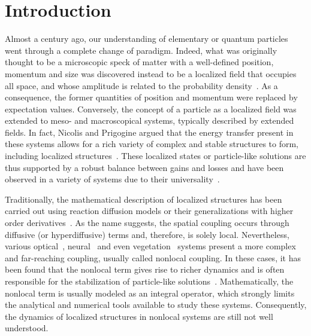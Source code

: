 \chapter{Introduction}

\label{ch:intro}

Almost a century ago, our understanding of elementary or quantum particles went
through a complete change of paradigm. Indeed, what was originally thought
to be a microscopic speck of matter with a well-defined position, momentum and size
was discovered instead to be a localized field that occupies all space, 
and whose amplitude is related to the probability 
density~\cite{merzbacher1998quantum,messiah2014quantum,gross1962particle}.
As a consequence,
the former quantities of position and momentum were replaced by expectation values.
Conversely, the concept of a particle as a localized field was extended to 
meso- and macroscopical systems, typically described by extended fields.
In fact, Nicolis and Prigogine argued that the energy transfer present in these systems
allows for a rich variety of complex and stable structures to form, including localized 
structures~\cite{prigogine1977self, pismen2006patterns}.
These localized states or particle-like solutions are thus supported by a robust balance between 
gains and losses and have been observed in a variety of systems due to their 
universality~\cite{umbanhowar1996localized,aranson2006patterns,minardi2010three,verschueren2013spatiotemporal,yi2018imaging}. 

Traditionally, the mathematical description of localized structures has been carried out using
reaction diffusion models or their generalizations with higher order 
derivatives~\cite{tlidi1994localized,coullet2000stable,knobloch2015spatial}.
As the name suggests, the spatial coupling occurs through diffusive (or hyperdiffusive) terms and, 
therefore, is solely local. Nevertheless, various optical~\cite{gelens2007impact}, 
neural~\cite{coombes2005waves} and even vegetation~\cite{lefever1997origin} systems present a more 
complex and far-reaching coupling, usually called nonlocal coupling. In these cases,
it has been found that the nonlocal term gives rise to richer dynamics and is often responsible for the
stabilization of particle-like solutions~\cite{fernandez2013strong, clerc2020time}. Mathematically, the nonlocal term is usually modeled as an
integral operator, which strongly limits the analytical and numerical tools available to study these systems.
Consequently, the dynamics of localized structures in nonlocal systems are still not well understood.

